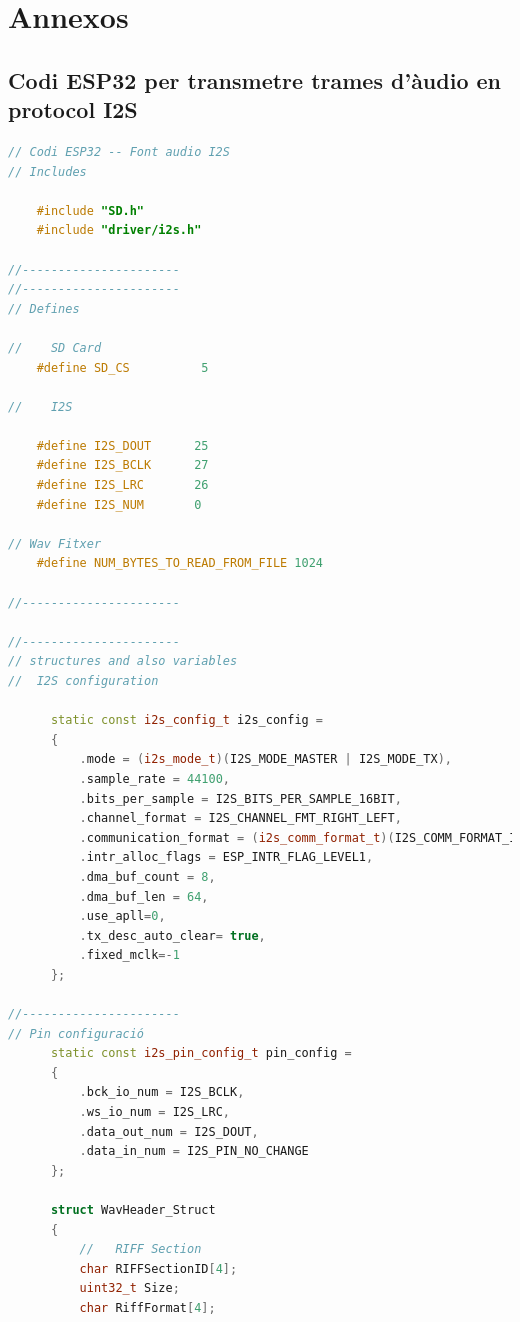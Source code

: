 \chapter{Annexos}
\section{Codi ESP32 per transmetre trames d'àudio en protocol I2S}
\begin{lstlisting}[language=C++, basicstyle=\ttfamily\small, breaklines=true, frame=single]
// Codi ESP32 -- Font audio I2S
// Includes

    #include "SD.h"                         
    #include "driver/i2s.h"          
  
//----------------------
//----------------------
// Defines
 
//    SD Card
    #define SD_CS          5    
   
//    I2S

    #define I2S_DOUT      25    
    #define I2S_BCLK      27   
    #define I2S_LRC       26    
    #define I2S_NUM       0    

// Wav Fitxer
    #define NUM_BYTES_TO_READ_FROM_FILE 1024   

//----------------------

//----------------------
// structures and also variables
//  I2S configuration

      static const i2s_config_t i2s_config = 
      {
          .mode = (i2s_mode_t)(I2S_MODE_MASTER | I2S_MODE_TX),
          .sample_rate = 44100,                                
          .bits_per_sample = I2S_BITS_PER_SAMPLE_16BIT,
          .channel_format = I2S_CHANNEL_FMT_RIGHT_LEFT,
          .communication_format = (i2s_comm_format_t)(I2S_COMM_FORMAT_I2S | I2S_COMM_FORMAT_I2S_MSB),
          .intr_alloc_flags = ESP_INTR_FLAG_LEVEL1,             
          .dma_buf_count = 8,                           
          .dma_buf_len = 64,                                    
          .use_apll=0,
          .tx_desc_auto_clear= true, 
          .fixed_mclk=-1    
      };
    
//----------------------
// Pin configuració      
      static const i2s_pin_config_t pin_config = 
      {
          .bck_io_num = I2S_BCLK,              
          .ws_io_num = I2S_LRC,                           
          .data_out_num = I2S_DOUT,                       
          .data_in_num = I2S_PIN_NO_CHANGE                  
      };
      
      struct WavHeader_Struct
      {
          //   RIFF Section    
          char RIFFSectionID[4];    
          uint32_t Size;             
          char RiffFormat[4];         
          

\end{lstlisting}
